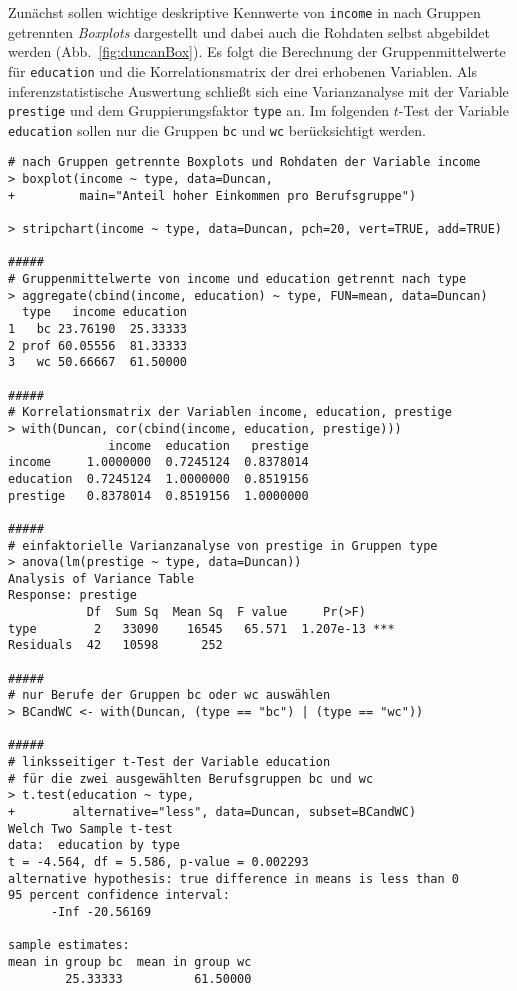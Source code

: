 Zunächst sollen wichtige deskriptive Kennwerte von \lstinline!income! in nach Gruppen getrennten \emph{Boxplots} dargestellt und dabei auch die Rohdaten selbst abgebildet werden (Abb.\ \ref{fig:duncanBox}). Es folgt die Berechnung der Gruppenmittelwerte für \lstinline!education! und die Korrelationsmatrix der drei erhobenen Variablen. Als inferenzstatistische Auswertung schließt sich eine Varianzanalyse mit der Variable \lstinline!prestige! und dem Gruppierungsfaktor \lstinline!type! an. Im folgenden $t$-Test der Variable \lstinline!education! sollen nur die Gruppen \lstinline!bc! und \lstinline!wc! berücksichtigt werden.
\begin{lstlisting}
# nach Gruppen getrennte Boxplots und Rohdaten der Variable income
> boxplot(income ~ type, data=Duncan,
+         main="Anteil hoher Einkommen pro Berufsgruppe")

> stripchart(income ~ type, data=Duncan, pch=20, vert=TRUE, add=TRUE)

#####
# Gruppenmittelwerte von income und education getrennt nach type
> aggregate(cbind(income, education) ~ type, FUN=mean, data=Duncan)
  type   income education
1   bc 23.76190  25.33333
2 prof 60.05556  81.33333
3   wc 50.66667  61.50000

#####
# Korrelationsmatrix der Variablen income, education, prestige
> with(Duncan, cor(cbind(income, education, prestige)))
              income  education   prestige
income     1.0000000  0.7245124  0.8378014
education  0.7245124  1.0000000  0.8519156
prestige   0.8378014  0.8519156  1.0000000

#####
# einfaktorielle Varianzanalyse von prestige in Gruppen type
> anova(lm(prestige ~ type, data=Duncan))
Analysis of Variance Table
Response: prestige
           Df  Sum Sq  Mean Sq  F value     Pr(>F)
type        2   33090    16545   65.571  1.207e-13 ***
Residuals  42   10598      252

#####
# nur Berufe der Gruppen bc oder wc auswählen
> BCandWC <- with(Duncan, (type == "bc") | (type == "wc"))

#####
# linksseitiger t-Test der Variable education
# für die zwei ausgewählten Berufsgruppen bc und wc
> t.test(education ~ type,
+        alternative="less", data=Duncan, subset=BCandWC)
Welch Two Sample t-test
data:  education by type
t = -4.564, df = 5.586, p-value = 0.002293
alternative hypothesis: true difference in means is less than 0
95 percent confidence interval:
      -Inf -20.56169

sample estimates:
mean in group bc  mean in group wc
        25.33333          61.50000
\end{lstlisting}

